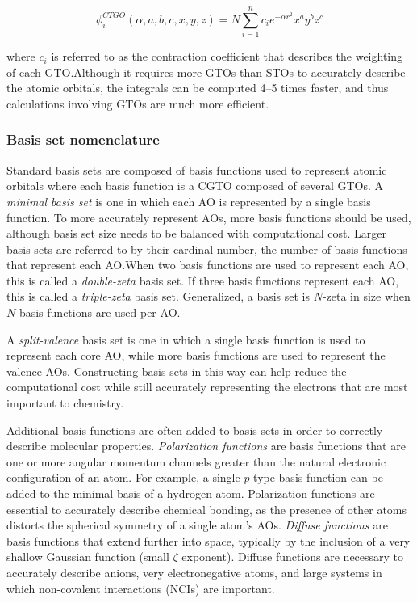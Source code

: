 \begin{doublespace}
\begin{equation}
\phi_i^{CTGO}(\alpha,a,b,c,x,y,z) = N \sum_{i=1}^n c_i e^{-\alpha r^2} x^a y^b z^c
\end{equation}

\noindent where $c_i$ is referred to as the contraction coefficient that
describes the weighting of each GTO.\@ Although it requires more GTOs than STOs
to accurately describe the atomic orbitals, the integrals can be computed 4--5
times faster, and thus calculations involving GTOs are much more
efficient.\cite{Gill1994}

\subsubsection{Basis set nomenclature}

Standard basis sets are composed of basis functions used to represent atomic
orbitals where each basis function is a CGTO composed of several GTOs. A
\emph{minimal basis set} is one in which each AO is represented by a single
basis function. To more accurately represent AOs, more basis functions should
be used, although basis set size needs to be balanced with computational cost.
Larger basis sets are referred to by their cardinal number, the number of basis
functions that represent each AO.\@ When two basis functions are used to
represent each AO, this is called a \emph{double-zeta} basis set. If three
basis functions represent each AO, this is called a \emph{triple-zeta} basis
set. Generalized, a basis set is $N$-zeta in size when $N$ basis functions are
used per AO.\@

A \emph{split-valence} basis set is one in which a single basis function is
used to represent each core AO, while more basis functions are used to
represent the valence AOs. Constructing basis sets in this way can help reduce
the computational cost while still accurately representing the electrons that
are most important to chemistry.

Additional basis functions are often added to basis sets in order to correctly
describe molecular properties. \emph{Polarization functions} are basis
functions that are one or more angular momentum channels greater than the
natural electronic configuration of an atom. For example, a single $p$-type
basis function can be added to the minimal basis of a hydrogen atom.
Polarization functions are essential to accurately describe chemical bonding,
as the presence of other atoms distorts the spherical symmetry of a single
atom's AOs.\cite{Szabo1996} \emph{Diffuse functions} are basis functions that
extend further into space, typically by the inclusion of a very shallow
Gaussian function (small $\zeta$ exponent). Diffuse functions are necessary to
accurately describe anions, very electronegative atoms, and large systems in
which non-covalent interactions (NCIs) are important.


\end{doublespace}

